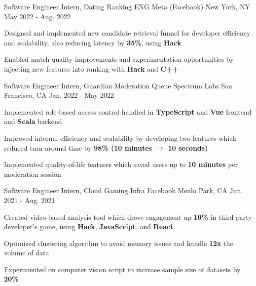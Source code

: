 

\begin{cventries}
  \cventry
    {Software Engineer Intern, Dating Ranking ENG} %
    {Meta (Facebook)} %
    {New York, NY} %
    {May 2022 - Aug. 2022} %
    {
      \begin{cvitems} %
        \item {Designed and implemented new candidate retrieval funnel for developer efficiency and scalability, also reducing latency by \textbf{35\%}, using \textbf{Hack}}
        \item {Enabled match quality improvements and experimentation opportunities by injecting new features into ranking with \textbf{Hack} and \textbf{C++}}
      \end{cvitems}
    }

  \cventry
    {Software Engineer Intern, Guardian Moderation Queue} %
    {Spectrum Labs} %
    {San Francisco, CA} %
    {Jan. 2022 - May 2022} %
    {
      \begin{cvitems} %
        \item {Implemented role-based access control handled in \textbf{TypeScript} and \textbf{Vue} frontend and \textbf{Scala} backend}
        \item {Improved internal efficiency and scalability by developing two features which reduced turn-around-time by \textbf{98\% (10 minutes $\rightarrow$ 10 seconds)}}
        \item {Implemented quality-of-life features which saved users up to \textbf{10 minutes} per moderation session}
      \end{cvitems}
    }

  \cventry
    {Software Engineer Intern, Cloud Gaming Infra} %
    {Facebook} %
    {Menlo Park, CA} %
    {Jun. 2021 - Aug. 2021} %
    {
      \begin{cvitems} %
        \item {Created video-based analysis tool which drove engagement up \textbf{10\%} in third party developer's game, using \textbf{Hack}, \textbf{JavaScript}, and \textbf{React}}
        \item {Optimized clustering algorithm to avoid memory issues and handle \textbf{12x} the volume of data}
        \item {Experimented on computer vision script to increase sample size of datasets by \textbf{20\%}}
      \end{cvitems}
    }


\end{cventries}
